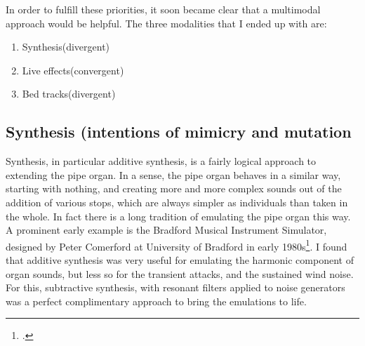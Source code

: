 \documentclass[12pt,twoside,maitrise]{dms_ks}
\theoremstyle{definition}
\begin{document}
In order to fulfill these priorities, it soon became clear that a multimodal approach would be helpful. The three modalities that I ended up with are:

\begin{enumerate}
  \item Synthesis(divergent)
  
  \item Live effects(convergent)
  
  \item Bed tracks(divergent)
\end{enumerate}

\subsection{Synthesis (intentions of mimicry and mutation}

Synthesis, in particular additive synthesis, is a fairly logical approach to extending the pipe organ. 
In a sense, the pipe organ behaves in a similar way, starting with nothing, and creating more and more complex sounds out of the addition of various stops, which are always simpler as individuals than taken in the whole. 
In fact there is a long tradition of emulating the pipe organ this way. 
A prominent early example is the Bradford Musical Instrument Simulator, designed by Peter Comerford at University of Bradford in early 1980s\footcite[61]{comerford_simulating_1993}. 
I found that additive synthesis was very useful for emulating the harmonic component of organ sounds, but less so for the transient attacks, and the sustained wind noise. 
For this, subtractive synthesis, with resonant filters applied to noise generators was a perfect complimentary approach to bring the emulations to life.

\end{document}
